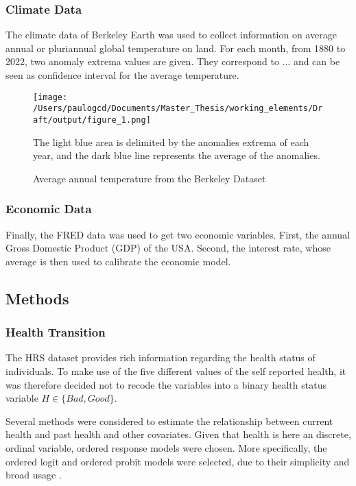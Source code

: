 \documentclass{article}
\begin{document}
\subsubsection{Climate Data}

The climate data of Berkeley Earth was used to collect information
on average annual or pluriannual global temperature on land. 
For each month, from 1880 to 2022, two anomaly extrema values are given. 
They correspond to ... and can be seen as confidence interval for the
average temperature. 

\begin{figure}[H]
    \texttt{[image: /Users/paulogcd/Documents/Master\_Thesis/working\_elements/Draft/output/figure\_1.png]}
    \caption{Average annual temperature from the Berkeley Dataset}
    
    The light blue area is delimited by the anomalies extrema of each year, and
    the dark blue line represents the average of the anomalies.
\end{figure}

\subsubsection{Economic Data}

Finally, the FRED data was used to get two economic variables. 
First, the annual Gross Domestic Product (GDP) of the USA. 
Second, the interest rate, whose average is then used to calibrate the economic model.

\subsection{Methods}

\subsubsection{Health Transition}

The HRS dataset provides rich information regarding the health status of individuals. 
To make use of the five different values of the self reported health, it was therefore decided not to
recode the variables into a binary health status variable $H\in\{Bad, Good\}$. 

Several methods were considered to estimate the relationship between current health and past health and other covariates. 
Given that health is here an discrete, ordinal variable, ordered response models were chosen.
More specifically, the ordered logit and ordered probit models were selected, due to their simplicity and broad usage \parencite{Wooldridge_2010}.
\end{document}

